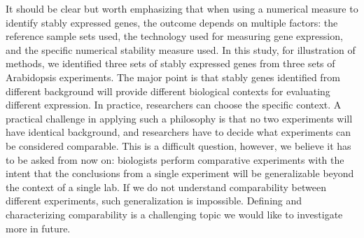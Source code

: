 				
				It should be clear but worth emphasizing that when using a numerical measure
				to identify stably expressed genes, the outcome depends on multiple factors:
				the reference sample sets used, the technology used for measuring gene
				expression, and the specific numerical stability measure used.  In this study,
				for illustration of methods, we identified three sets of stably expressed
				genes from three sets of Arabidopsis experiments. The major point is that
				stably genes identified from different background will provide different
				biological contexts for evaluating different expression. In practice,
				researchers can choose the specific context. A practical challenge in applying
				such a philosophy is that no two experiments will have identical background,
				and researchers have to decide what experiments can be considered comparable. This
				is a difficult question, however, we believe it has to be asked from now on:
				biologists perform comparative experiments with the intent that the
				conclusions from a single experiment will be generalizable beyond the context
				of a single lab. If we do not understand comparability between different
				experiments, such generalization is impossible. Defining and characterizing
				comparability is a challenging topic we would like to investigate more in
				future.
				
				
				
